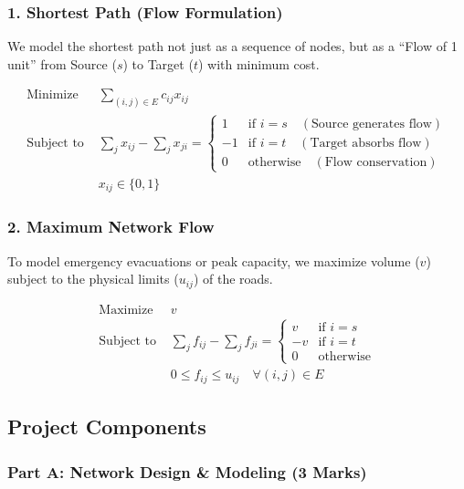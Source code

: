 \documentclass[
  letterpaper,
  DIV=11,
  numbers=noendperiod]{scrreprt}
\begin{document}
\subsubsection{1. Shortest Path (Flow
Formulation)}\label{shortest-path-flow-formulation}

We model the shortest path not just as a sequence of nodes, but as a
``Flow of 1 unit'' from Source (\(s\)) to Target (\(t\)) with minimum
cost.

\[
\begin{aligned}
\text{Minimize } & \sum_{(i,j) \in E} c_{ij} x_{ij} \\
\text{Subject to } & \sum_{j} x_{ij} - \sum_{j} x_{ji} = 
\begin{cases}
1 & \text{if } i = s \quad (\text{Source generates flow}) \\
-1 & \text{if } i = t \quad (\text{Target absorbs flow}) \\
0 & \text{otherwise} \quad (\text{Flow conservation})
\end{cases} \\
& x_{ij} \in \{0, 1\}
\end{aligned}
\]

\subsubsection{2. Maximum Network Flow}\label{maximum-network-flow}

To model emergency evacuations or peak capacity, we maximize volume
(\(v\)) subject to the physical limits (\(u_{ij}\)) of the roads.

\[
\begin{aligned}
\text{Maximize } & v \\
\text{Subject to } & \sum_{j} f_{ij} - \sum_{j} f_{ji} = 
\begin{cases}
v & \text{if } i = s \\
-v & \text{if } i = t \\
0 & \text{otherwise}
\end{cases} \\
& 0 \leq f_{ij} \leq u_{ij} \quad \forall (i,j) \in E
\end{aligned}
\]

\subsection{Project Components}\label{project-components}

\subsubsection{Part A: Network Design \& Modeling (3
Marks)}\label{part-a-network-design-modeling-3-marks}
\end{document}

